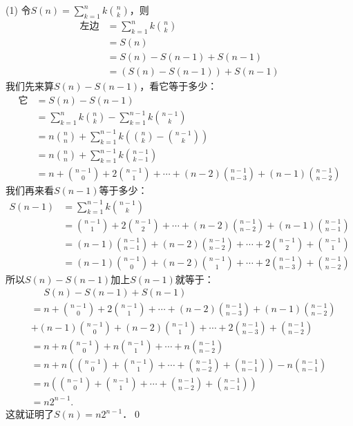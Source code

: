 (1) \prove 令$S(n) = \displaystyle\sum_{k=1}^{n} k \binom{n}{k}$，则
\begin{align}
    \text{左边} &= \sum_{k=1}^{n} k \binom{n}{k} \\
    &= S(n) \\
    &= S(n) - S(n-1) + S(n-1) \\
    &= (S(n) - S(n-1)) + S(n-1)
\end{align}
我们先来算$S(n)-S(n-1)$，看它等于多少：
\begin{align}
    \text{它} &= S(n) - S(n-1) \\
    &= \sum_{k = 1}^{n} k \binom{n}{k} - \sum_{k = 1}^{n-1} k \binom{n-1}{k} \\
    &= n \binom{n}{n} + \sum_{k=1}^{n-1} k \left(\binom{n}{k} - \binom{n-1}{k}\right) \\
    &= n \binom{n}{n} + \sum_{k=1}^{n-1} k \binom{n-1}{k-1} \\
    &= n + \binom{n-1}{0} + 2 \binom{n-1}{1} + \cdots + (n-2)\binom{n-1}{n-3} + (n-1)\binom{n-1}{n-2}
\end{align}
我们再来看$S(n-1)$等于多少：
\begin{align}
    S(n-1) &= \sum_{k=1}^{n-1} k \binom{n-1}{k} \\
    &= \binom{n-1}{1} + 2\binom{n-1}{2} + \cdots + (n-2)\binom{n-1}{n-2} + (n-1)\binom{n-1}{n-1} \\
    &= (n-1) \binom{n-1}{n-1} + (n-2)\binom{n-1}{n-2} + \cdots + 2 \binom{n-1}{2} + \binom{n-1}{1} \\
    &= (n-1) \binom{n-1}{0} + (n-2)\binom{n-1}{1} + \cdots + 2 \binom{n-1}{n-3} + \binom{n-1}{n-2}
\end{align}
所以$S(n)-S(n-1)$加上$S(n-1)$就等于：
\begin{align}
    &\mathrel{\phantom{=}} S(n) - S(n-1) + S(n-1) \\
    &= n + \binom{n-1}{0} + 2 \binom{n-1}{1} + \cdots + (n-2)\binom{n-1}{n-3} + (n-1)\binom{n-1}{n-2} \\
    &+ (n-1) \binom{n-1}{0} + (n-2)\binom{n-1}{1} + \cdots + 2 \binom{n-1}{n-3} + \binom{n-1}{n-2} \\
    &= n + n \binom{n-1}{0} + n \binom{n-1}{1} + \cdots + n\binom{n-1}{n-2} \\
    &= n + n (\binom{n-1}{0} +  \binom{n-1}{1} + \cdots + \binom{n-1}{n-2} + \binom{n-1}{n-1}) - n\binom{n-1}{n-1} \\
    &= n (\binom{n-1}{0} +  \binom{n-1}{1} + \cdots + \binom{n-1}{n-2} + \binom{n-1}{n-1}) \\
    &= n 2^{n-1}.
\end{align}
这就证明了$S(n) = n 2^{n-1}$．\qed\bigskip

